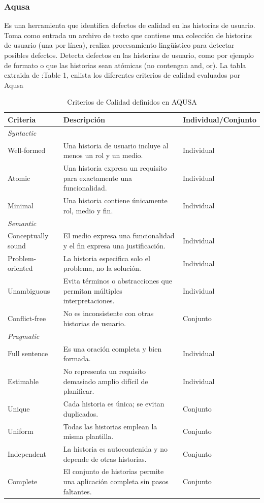\subsubsection{Aqusa}
Es una herramienta \cite{aqusa} que identifica defectos de calidad en las historias de usuario. Toma como entrada un archivo de texto que contiene una colección de historias de usuario (una por línea), realiza procesamiento lingüístico para detectar posibles defectos. Detecta defectos en las historias de usuario, como por ejemplo de formato o que las historias sean atómicas (no contengan and, or). La tabla extraida de \cite{aqusa-paper}:Table 1, enlista los diferentes criterios de calidad evaluados por Aqusa

\begin{table}[h]
\centering
\begin{tabular}{|l|p{7cm}|l|}
\hline
\textbf{Criteria} & \textbf{Descripción} & \textbf{Individual/Conjunto} \\
\hline

\multicolumn{3}{|l|}{\textit{Syntactic}} \\ \hline
Well-formed & Una historia de usuario incluye al menos un rol y un medio. & Individual \\ \hline
Atomic & Una historia expresa un requisito para exactamente una funcionalidad. & Individual \\ \hline
Minimal & Una historia contiene únicamente rol, medio y fin. & Individual \\ \hline

\multicolumn{3}{|l|}{\textit{Semantic}} \\ \hline
Conceptually sound & El medio expresa una funcionalidad y el fin expresa una justificación. & Individual \\ \hline
Problem-oriented & La historia especifica solo el problema, no la solución. & Individual \\ \hline
Unambiguous & Evita términos o abstracciones que permitan múltiples interpretaciones. & Individual \\ \hline
Conflict-free & No es inconsistente con otras historias de usuario. & Conjunto \\ \hline

\multicolumn{3}{|l|}{\textit{Pragmatic}} \\ \hline
Full sentence & Es una oración completa y bien formada. & Individual \\ \hline
Estimable & No representa un requisito demasiado amplio difícil de planificar. & Individual \\ \hline
Unique & Cada historia es única; se evitan duplicados. & Conjunto \\ \hline
Uniform & Todas las historias emplean la misma plantilla. & Conjunto \\ \hline
Independent & La historia es autocontenida y no depende de otras historias. & Conjunto \\ \hline
Complete & El conjunto de historias permite una aplicación completa sin pasos faltantes. & Conjunto \\ \hline

\end{tabular}
\caption{Criterios de Calidad definidos en AQUSA}
\end{table}


